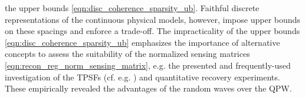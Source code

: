 the upper bounds
\eqref{eqn:disc_coherence_sparsity_ub}.
Faithful discrete representations of
the continuous physical models, however, impose
upper bounds on
these spacings and enforce
a trade-off.
The impracticality of
the upper bounds
\eqref{eqn:disc_coherence_sparsity_ub} emphasizes
the importance of
alternative concepts to assess
the suitability of
the normalized sensing matrices
\eqref{eqn:recon_reg_norm_sensing_matrix}, e.g.
the presented and
frequently-used investigation of
the \acp{TPSF}
(cf. e.g.
\cite{article:ProvostITMI2009,article:LustigMRM2007}%
) and
quantitative recovery experiments.
These empirically revealed
the advantages of
the random waves over
the \ac{QPW}.
